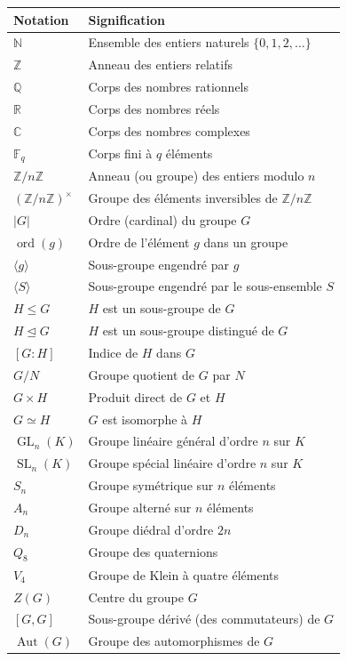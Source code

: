 \documentclass[12pt,a4paper,openany]{book}
\theoremstyle{definition}
\newcommand{\N}{\mathbb{N}}
\newcommand{\Z}{\mathbb{Z}}
\newcommand{\Q}{\mathbb{Q}}
\newcommand{\R}{\mathbb{R}}
\newcommand{\C}{\mathbb{C}}
\newcommand{\F}{\mathbb{F}}
\DeclareMathOperator{\Aut}{Aut}
\DeclareMathOperator{\ord}{ord}
\DeclareMathOperator{\GL}{GL}
\DeclareMathOperator{\SL}{SL}
\newcommand{\iso}{\simeq}
\newcommand{\normal}{\trianglelefteq}
\newcommand{\abs}[1]{\lvert #1 \rvert}
\newcommand{\gen}[1]{\langle #1 \rangle}
\newcommand{\idx}[2]{[#1:#2]}
\begin{document}
\begin{tabular}{@{}ll@{}}
\toprule
\textbf{Notation} & \textbf{Signification} \\
\midrule
$\N$ & Ensemble des entiers naturels $\{0,1,2,\ldots\}$ \\
$\Z$ & Anneau des entiers relatifs \\
$\Q$ & Corps des nombres rationnels \\
$\R$ & Corps des nombres réels \\
$\C$ & Corps des nombres complexes \\
$\F_q$ & Corps fini à $q$ éléments \\
$\Z/n\Z$ & Anneau (ou groupe) des entiers modulo $n$ \\
$(\Z/n\Z)^\times$ & Groupe des éléments inversibles de $\Z/n\Z$ \\
$\abs{G}$ & Ordre (cardinal) du groupe $G$ \\
$\ord(g)$ & Ordre de l'élément $g$ dans un groupe \\
$\gen{g}$ & Sous-groupe engendré par $g$ \\
$\gen{S}$ & Sous-groupe engendré par le sous-ensemble $S$ \\
$H \leq G$ & $H$ est un sous-groupe de $G$ \\
$H \normal G$ & $H$ est un sous-groupe distingué de $G$ \\
$\idx{G}{H}$ & Indice de $H$ dans $G$ \\
$G/N$ & Groupe quotient de $G$ par $N$ \\
$G \times H$ & Produit direct de $G$ et $H$ \\
$G \iso H$ & $G$ est isomorphe à $H$ \\
$\GL_n(K)$ & Groupe linéaire général d'ordre $n$ sur $K$ \\
$\SL_n(K)$ & Groupe spécial linéaire d'ordre $n$ sur $K$ \\
$S_n$ & Groupe symétrique sur $n$ éléments \\
$A_n$ & Groupe alterné sur $n$ éléments \\
$D_n$ & Groupe diédral d'ordre $2n$ \\
$Q_8$ & Groupe des quaternions \\
$V_4$ & Groupe de Klein à quatre éléments \\
$Z(G)$ & Centre du groupe $G$ \\
$[G,G]$ & Sous-groupe dérivé (des commutateurs) de $G$ \\
$\Aut(G)$ & Groupe des automorphismes de $G$ \\

\end{tabular}
\end{document}
